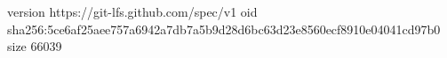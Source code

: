 version https://git-lfs.github.com/spec/v1
oid sha256:5ce6af25aee757a6942a7db7a5b9d28d6bc63d23e8560ecf8910e04041cd97b0
size 66039
